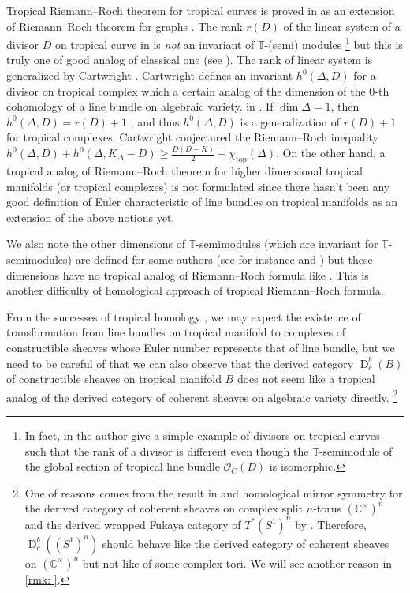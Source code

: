 \documentclass[a4paper,dvipdfmx,reqno,12pt]{amsart}
\theoremstyle{definition}
\newcommand{\C}{\mathbb{C}}%
\newcommand{\mb}[1]{\mathbb{#1}}%
\newcommand{\mcal}[1]{\mathcal{#1}}%
\newcommand{\opn}[1]{\operatorname{#1}}
\newcommand{\myfootnote}[1]{\hspace{-5pt}\footnote{#1}}
\numberwithin{equation}{section}
\begin{document}
Tropical Riemann--Roch theorem for tropical curves 
is proved in \cite{gathmannRiemannRochTheoremTropical2008a}
as an extension of Riemann--Roch theorem for graphs
\cite{MR2355607}. The rank $r(D)$ of the linear system of a divisor $D$ 
on tropical curve in 
\cite{gathmannRiemannRochTheoremTropical2008a}
is \emph{not} an invariant of $\mb{T}$-(semi) modules
\myfootnote{In fact, 
in \cite[Example 6.5]{yoshitomi2011generators} 
the author give a simple example of divisors on 
tropical curves such that 
the rank of a divisor is different even though 
the $\mathbb{T}$-semimodule of the global section of 
tropical line bundle $\mcal{O}_C(D)$ is isomorphic.}
but this is truly one of good analog of classical one 
(see \cite[Lemma 2.4]{MR2448666}).
The rank of linear system is generalized by Cartwright
\cite{MR4131998,MR4251610}.
Cartwright defines an invariant 
$h^{0}(\Delta,D)$ for a divisor on tropical complex
which a certain analog of the dimension of
the $0$-th cohomology of a line bundle on algebraic 
variety.
in \cite[Definition 3.1]{MR4251610}.
If $\dim \Delta=1$, then $h^{0}(\Delta,D)=r(D)+1$
\cite[Proposition 3.3]{MR4251610}, and thus $h^{0}(\Delta,D)$
is a generalization of $r(D)+1$ for tropical complexes. 
Cartwright conjectured the Riemann--Roch inequality
$h^{0}(\Delta,D)+h^{0}(\Delta,K_{\Delta}-D)\geq 
\frac{D(D-K)}{2}+\chi_{\opn{top}}(\Delta)$.
On the other hand, a tropical analog of Riemann--Roch theorem
for higher dimensional tropical manifolds 
(or tropical complexes) is not formulated
since there hasn't been any good definition of 
Euler characteristic of line bundles on tropical 
manifolds as an extension of the above notions yet.

We also note the other dimensions of $\mb{T}$-semimodules 
(which are invariant for $\mb{T}$-semimodules) are defined for 
some authors 
(see for instance 
\cite[Definition 2.3]{mikhalkinTropicalCurvesTheir2008a}
and \cite[p.8]{yoshitomi2011generators}) but 
these dimensions have no tropical analog of 
Riemann--Roch formula like 
\cite{MR2355607,gathmannRiemannRochTheoremTropical2008a}.
This is another difficulty of homological approach of 
tropical Riemann--Roch formula. 

From the successes of tropical homology \cite{itenbergTropicalHomology2019b}, we 
may expect the existence of transformation from 
line bundles on tropical manifold to complexes of
constructible sheaves whose Euler number 
represents that of line bundle, but we need to 
be careful of that we can also observe that
the derived category $\opn{D}_{c}^{b}(B)$
of constructible sheaves on 
tropical manifold $B$ does not seem like a tropical 
analog of the derived category of coherent 
sheaves on algebraic variety directly.
\myfootnote{One of reasons
comes from the result in \cite{MR2449059,MR2565051}
and homological mirror symmetry for 
the derived category of coherent sheaves on complex split $n$-torus 
$(\C^{\times})^{n}$ and the derived wrapped Fukaya category of $T^{*}(S^{1})^{n}$
by \cite{MR2822213}.
Therefore, $\opn{D}_c^{b}((S^{1})^{n})$ should behave like 
the derived category of coherent sheaves on $(\C^{\times})^{n}$
but not like of some complex tori.
We will see another reason in \cref{rmk: }.
}
\end{document}
